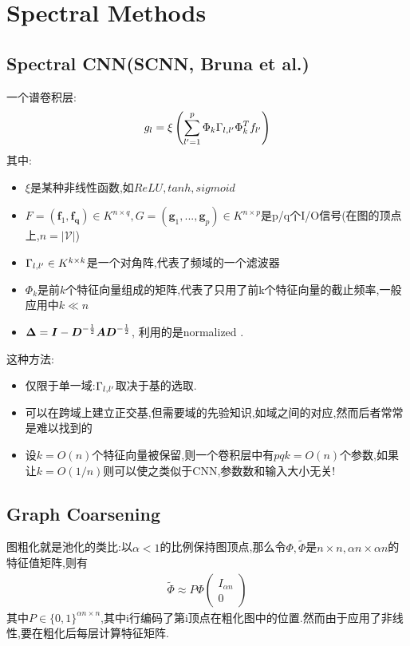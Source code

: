 \documentclass{article}
\begin{document}
\section{Spectral Methods}

\subsection{Spectral CNN(SCNN, Bruna et al.)}
一个谱卷积层:
\begin{align}
    g_l=\xi\left(\sum_{l'=1}^p \Phi_k \Gamma_{l,l'} \Phi_k^T f_{l'}\right)
\end{align}
其中:
\begin{itemize}
    \item $\xi$是某种非线性函数,如$ReLU, tanh, sigmoid$
    \item $F=(\mathbf f_1, \mathbf{f_q})\in K^{n\times q},G=(\mathbf g_1,...,\mathbf g_p)\in K^{n\times p}$是p/q个I/O信号(在图的顶点上,$n=|\mathcal{V}|$)
    \item $\Gamma_{l,l'}\in K^{k\times k}$是一个对角阵,代表了频域的一个滤波器
    \item $\Phi_k$是前$k$个特征向量组成的矩阵,代表了只用了前k个特征向量的截止频率,一般应用中$k\ll n$
    \item $\boldsymbol{\Delta}=\boldsymbol{I} - \boldsymbol{D}^{-\frac{1}{2}} \boldsymbol{A} \boldsymbol{D}^{-\frac{1}{2}}$, 利用的是normalized \lop.
\end{itemize}
这种方法:
\begin{itemize}
    \item 仅限于单一域:$\Gamma_{l,l'}$取决于基的选取.
    \item 可以在跨域上建立正交基,但需要域的先验知识,如域之间的对应,然而后者常常是难以找到的
    \item 设$k=O(n)$个特征向量被保留,则一个卷积层中有$pqk=O(n)$个参数,如果让$k=O(1/n)$则可以使之类似于CNN,参数数和输入大小无关!
\end{itemize}

\subsection{Graph Coarsening}
图粗化就是池化的类比:以$\alpha<1$的比例保持图顶点,那么令$\Phi,\widetilde{\Phi}$是$n\times n, \alpha n \times \alpha n$的特征值矩阵,则有
\begin{align}
    \widetilde{\Phi}\approx P\Phi\left(\begin{array}{ccc}
        I_{\alpha n}\\
        0
    \end{array}\right)
\end{align}
其中$P\in\{0,1\}^{\alpha n\times n}$,其中i行编码了第i顶点在粗化图中的位置.然而由于应用了非线性,要在粗化后每层计算特征矩阵.
\end{document}
